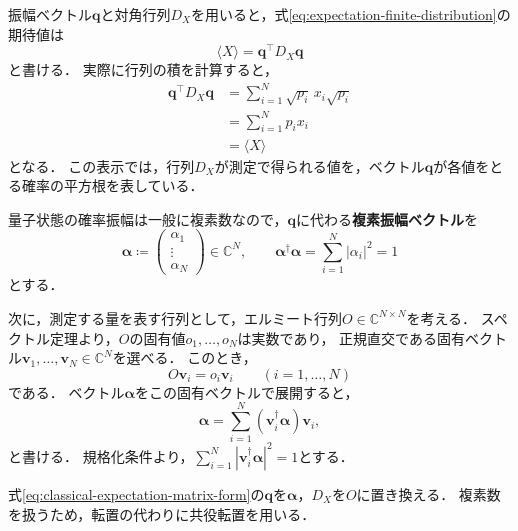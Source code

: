 振幅ベクトル$\bm{q}$と対角行列$D_X$を用いると，式\eqref{eq:expectation-finite-distribution}の期待値は
\begin{equation}
  \langle X\rangle=\bm{q}^\top D_X \bm{q}
  \label{eq:classical-expectation-matrix-form}
\end{equation}
と書ける．
実際に行列の積を計算すると，
\begin{equation*}
  \begin{aligned}
    \bm{q}^\top D_X \bm{q}
     & =\sum_{i=1}^{N}\sqrt{p_i}\,x_i\sqrt{p_i} \\
     & =\sum_{i=1}^{N}p_i x_i                   \\
     & =\langle X\rangle
  \end{aligned}
\end{equation*}
となる．
この表示では，行列$D_X$が測定で得られる値を，ベクトル$\bm{q}$が各値をとる確率の平方根を表している．

量子状態の確率振幅は一般に複素数なので，$\bm{q}$に代わる\textbf{複素振幅ベクトル}を
\begin{equation}
  \bm{\alpha}\coloneq
  \begin{pmatrix}\alpha_1\\\vdots\\\alpha_N\end{pmatrix}
  \in\mathbb C^N,
  \qquad
  \bm{\alpha}^{\dagger}\bm{\alpha}
  =\sum_{i=1}^{N}|\alpha_i|^2=1
  \label{eq:complex-amplitude-vector}
\end{equation}
とする．

次に，測定する量を表す行列として，エルミート行列$O\in\mathbb C^{N\times N}$を考える．
スペクトル定理より，$O$の固有値$o_1,\ldots,o_N$は実数であり，
正規直交である固有ベクトル$\bm{v}_1,\ldots,\bm{v}_N \in \mathbb C^N$を選べる．
このとき，
\begin{equation*}
  O\bm{v}_i=o_i\bm{v}_i
  \qquad(i=1,\ldots,N)
\end{equation*}
である．
ベクトル$\bm{\alpha}$をこの固有ベクトルで展開すると，
\begin{equation}
  \bm{\alpha}=\sum_{i=1}^{N} (\bm{v}_i^{\dagger}\bm{\alpha}) \bm{v}_i,
  \label{eq:state-in-observable-eigenbasis}
\end{equation}
と書ける．
規格化条件より，$\sum_{i=1}^{N}|\bm{v}_i^{\dagger}\bm{\alpha}|^2=1$とする．

式\eqref{eq:classical-expectation-matrix-form}の$\bm{q}$を$\bm{\alpha}$，$D_X$を$O$に置き換える．
複素数を扱うため，転置の代わりに共役転置を用いる．

